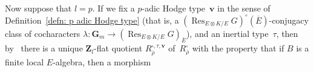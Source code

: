 \documentclass{amsart}
\renewcommand{\mathbb}{\mathbf}
\renewcommand{\ell}{l}
\newtheorem{prop}[subsubsection]{Proposition}
\theoremstyle{definition}
\theoremstyle{remark}
\newcommand{\Z}{\ZZ}
\newcommand{\GG}{{\mathbb G}}
\newcommand{\ZZ}{{\mathbb Z}}
\newcommand{\cO}{{\mathcal O}}
\newcommand{\Zl}{\Z_{\ell}}
\DeclareMathOperator{\Fil}{Fil}
\DeclareMathOperator{\Gal}{Gal}
\DeclareMathOperator{\Mod}{Mod}
\newcommand{\st}{\mathrm{st}}
\newcommand{\rhobar}{\overline{\rho}}
\newcommand{\Gm}{\GG_m}
\newcommand{\Res}{\operatorname{Res}}
\begin{document}
%
%
%
%
Now suppose that $l=p$.  If we fix a $p$-adic Hodge type~$\mathbf{v}$  in the sense of Definition~\ref{defn: p adic Hodge
  type} (that is, a  $(\Res_{E\otimes K/E}G)^\circ(\overline
E)$-conjugacy class of cocharacters $\lambda:\Gm\rightarrow
(\Res_{E\otimes K/E}G)_{\overline E}$), and an inertial type~$\tau$,
then by~\cite[Prop.\ 3.0.12]{MR3152673} there is a
unique $\Zl$-flat quotient $R_{\rhobar}^{\square,\tau,\mathbf{v}}$
of~$R_{\rhobar}^{\square}$ with the property that if $B$ is a finite
local $E$-algebra, then a morphism
\end{document}
